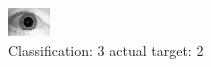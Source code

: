 \begin{figure}[h!]
\begin{center}
\includegraphics[width=0.60\columnwidth]{figures/ID1708_class_3_target_2.png}
\end{center}
\caption{ Classification: 3 actual target: 2}
\label{fig:ID1708_class_3_target_2}
\end{figure}
